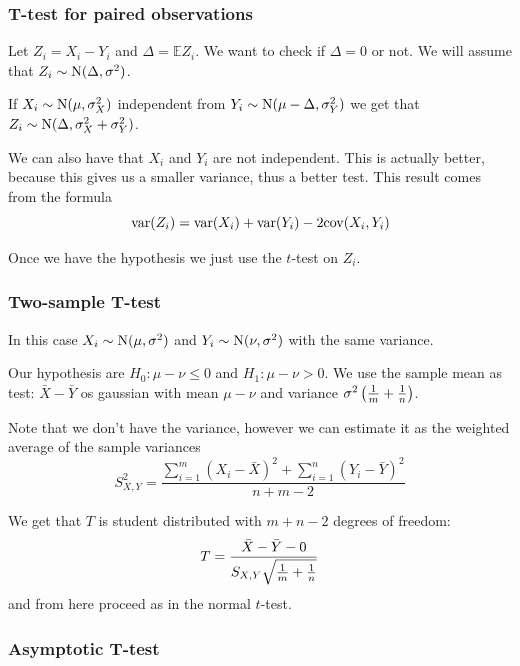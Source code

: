\documentclass[12pt]{extarticle}
\newcommand{\Normal}{{\operatorfont N}}
\begin{document}
\subsubsection{T-test for paired observations}

Let $Z_i = X_i - Y_i$ and $\Delta = \mathbb E Z_i$.
We want to check if $\Delta = 0$ or not.
We will assume that $Z_i \sim \Normal(\Delta, \sigma^2)$.

If $X_i \sim \Normal(\mu, \sigma_X^2)$ independent from $Y_i \sim \Normal(\mu - \Delta, \sigma_Y^2)$
we get that $Z_i \sim \Normal(\Delta, \sigma_X^2 + \sigma_Y^2)$.

We can also have that $X_i$ and $Y_i$ are not independent.
This is actually better, because this gives us a smaller variance, thus a better test.
This result comes from the formula
\begin{equation}
	\var(Z_i) = \var(X_i) + \var(Y_i) - 2 \cov (X_i, Y_i)
\end{equation}

Once we have the hypothesis we just use the $t$-test on $Z_i$.

\subsubsection{Two-sample T-test}

In this case $X_i \sim \Normal(\mu, \sigma^2)$ and $Y_i \sim \Normal(\nu, \sigma^2)$
with the same variance.

Our hypothesis are $H_0 : \mu - \nu \leq 0$ and $H_1 : \mu - \nu > 0$.
We use the sample mean as test: $\bar X- \bar Y$ os gaussian with mean $\mu - \nu$
and variance $\sigma^2 \left(\frac{1}{m} + \frac{1}{n}\right)$.

Note that we don't have the variance, however we can estimate it as the weighted average of the sample variances
\begin{equation}
	S^2_{X, Y} = \frac{\sum^m_{i = 1} (X_i - \bar X)^2 + \sum^n_{i = 1} (Y_i - \bar Y)^2 }{n + m - 2}
\end{equation}

We get that $T$ is student distributed with $m + n - 2$ degrees of freedom:
\begin{equation}
	T = \frac{\bar X - \bar Y - 0}{S_{X, Y} \sqrt{\frac{1}{m} + \frac{1}{n}}}
\end{equation}
and from here proceed as in the normal $t$-test.

\subsubsection{Asymptotic T-test}
\end{document}
